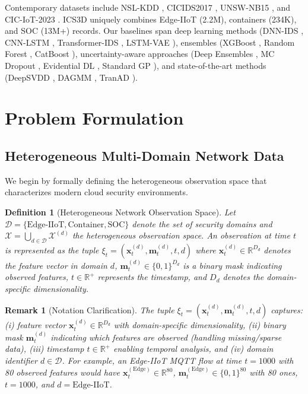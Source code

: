 \documentclass[review,12pt]{elsarticle}
\newcommand{\R}{\mathbb{R}}
\newtheorem{definition}{Definition}
\newtheorem{remark}{Remark}
\begin{document}
Contemporary datasets include NSL-KDD \cite{tavallaee2009detailed}, CICIDS2017 \cite{sharafaldin2018toward}, UNSW-NB15 \cite{moustafa2015unsw}, and CIC-IoT-2023 \cite{neto2023ciciot}. ICS3D \cite{RNA2025datasets} uniquely combines Edge-IIoT (2.2M), containers (234K), and SOC (13M+) records. Our baselines span deep learning methods (DNN-IDS \cite{vinayakumar2019deep}, CNN-LSTM \cite{kim2020cnn}, Transformer-IDS \cite{vaswani2017attention}, LSTM-VAE \cite{malhotra2016lstm}), ensembles (XGBoost \cite{chen2016xgboost}, Random Forest \cite{breiman2001random}, CatBoost \cite{prokhorenkova2018catboost}), uncertainty-aware approaches (Deep Ensembles \cite{lakshminarayanan2017simple}, MC Dropout \cite{gal2016dropout}, Evidential DL \cite{sensoy2018evidential}, Standard GP \cite{rasmussen2006gaussian}), and state-of-the-art methods (DeepSVDD \cite{ruff2018deep}, DAGMM \cite{zong2018deep}, TranAD \cite{tuli2022tranad}).

\section{Problem Formulation}

\subsection{Heterogeneous Multi-Domain Network Data}

We begin by formally defining the heterogeneous observation space that characterizes modern cloud security environments.

\begin{definition}[Heterogeneous Network Observation Space]
\begingroup\sloppy
Let \(\mathcal{D}=\{\text{Edge-IIoT},\allowbreak \text{Container},\allowbreak \text{SOC}\}\) denote the set of security domains and \(\mathcal{X}=\bigcup_{d\in\mathcal{D}}\mathcal{X}^{(d)}\) the heterogeneous observation space. An observation at time \(t\) is represented as the tuple \(\xi_t=(\mathbf{x}_t^{(d)},\allowbreak \mathbf{m}_t^{(d)},\allowbreak t,\allowbreak d)\) where \(\mathbf{x}_t^{(d)}\in\R^{D_d}\) denotes the feature vector in domain \(d\), \(\mathbf{m}_t^{(d)}\in\{0,1\}^{D_d}\) is a binary mask indicating observed features, \(t\in\R^+\) represents the timestamp, and \(D_d\) denotes the domain-specific dimensionality.
\par\endgroup
\end{definition}

\begin{remark}[Notation Clarification]
The tuple $\xi_t = (\mathbf{x}_t^{(d)}, \mathbf{m}_t^{(d)}, t, d)$ captures: (i) feature vector $\mathbf{x}_t^{(d)} \in \mathbb{R}^{D_d}$ with domain-specific dimensionality, (ii) binary mask $\mathbf{m}_t^{(d)}$ indicating which features are observed (handling missing/sparse data), (iii) timestamp $t \in \mathbb{R}^+$ enabling temporal analysis, and (iv) domain identifier $d \in \mathcal{D}$. For example, an Edge-IIoT MQTT flow at time $t=1000$ with 80 observed features would have $\mathbf{x}_t^{(\text{Edge})} \in \mathbb{R}^{80}$, $\mathbf{m}_t^{(\text{Edge})} \in \{0,1\}^{80}$ with 80 ones, $t=1000$, and $d=\text{Edge-IIoT}$.
\end{remark}
\end{document}
